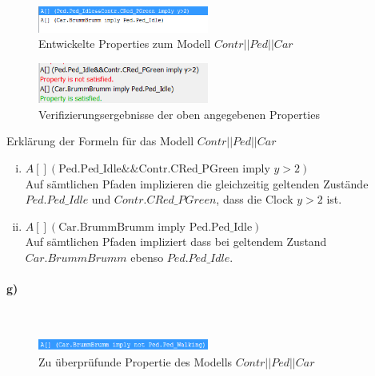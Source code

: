 \begin{figure}[H] 
	\centering 
	\includegraphics[width=0.5\textwidth]{./UPAAAL_Screens/2f_Verification}
	\caption[Aufgabe 2f)]{Entwickelte Properties zum Modell $Contr||Ped||Car$}    
\end{figure}

\begin{figure}[H] 
	\centering 
	\includegraphics[width=0.5\textwidth]{./UPAAAL_Screens/2f_Verification_CHECKED}
	\caption[Aufgabe 2f)]{Verifizierungsergebnisse der oben angegebenen Properties}    
\end{figure}


Erklärung der Formeln für das Modell $Contr||Ped||Car$

\begin{enumerate}[i)]
	
	\item $A \left[\right]  (\text{Ped.Ped\_Idle} \&\& \text{Contr.CRed\_PGreen} \text{ imply } y>2)$ \\
	Auf sämtlichen Pfaden implizieren die gleichzeitig geltenden Zustände $Ped.Ped\_Idle$ und $Contr.CRed\_PGreen$, dass die Clock $y>2$ ist. 
	
	
	\item $A \left[\right] (\text{Car.BrummBrumm} \text{ imply } \text{Ped.Ped\_Idle}) $\\
	Auf sämtlichen Pfaden impliziert dass bei geltendem Zustand $Car.BrummBrumm$ ebenso $Ped.Ped\_Idle$.
	
\end{enumerate}


\paragraph{g)}\mbox{} \\
\begin{figure}[H] 
	\centering 
	\includegraphics[width=0.5\textwidth]{./UPAAAL_Screens/2g_Formel}
	\caption[Aufgabe 2g)]{Zu überprüfunde Propertie des Modells $Contr||Ped||Car$}    
\end{figure}

